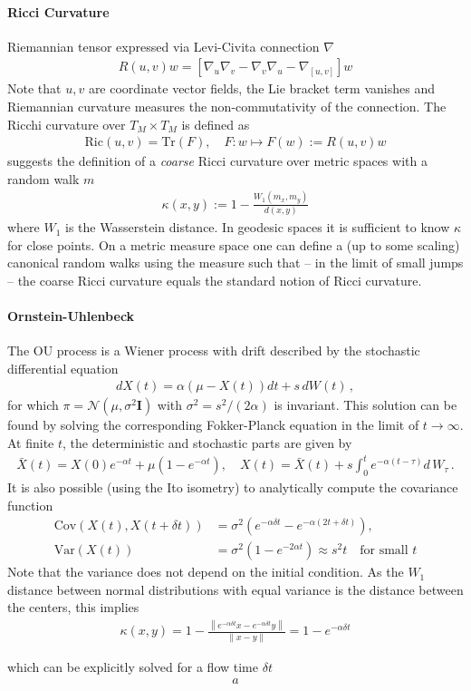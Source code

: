 \documentclass{article}
\begin{document}
\paragraph{Ricci Curvature} Riemannian tensor expressed via Levi-Civita connection $\nabla$
\begin{align}
R(u,v)w = \left[ \nabla_u \nabla_v- \nabla_v \nabla_u - \nabla_{[u,v]} \right] w
\end{align}
Note that $u,v$ are coordinate vector fields, the Lie bracket term vanishes and Riemannian curvature measures the non-commutativity of the connection. The Ricchi curvature over $T_M \times T_M$ is defined as
\begin{align}
\text{Ric}(u,v) = \text{Tr}(F), \quad F: w \mapsto F(w):=  R(u,v) w
\end{align}
\cite{ollivier2009ricci} suggests the definition of a \textit{coarse} Ricci curvature over metric spaces with a random walk $m$
\begin{align}
\kappa(x,y):=1 - \frac{W_1(m_x,m_y)}{d(x,y)}
\end{align}
where $W_1$ is the Wasserstein distance. In geodesic spaces it is sufficient to know $\kappa$ for close points. On a metric measure space one can define a (up to some scaling) canonical random walks using the measure such that -- in the limit of small jumps -- the coarse Ricci curvature equals the standard notion of Ricci curvature. 


\paragraph{Ornstein-Uhlenbeck} The OU process is a Wiener process with drift described by the stochastic differential equation
\begin{align}
dX(t) = \alpha (\mu - X(t)) dt + s \, dW(t)\,, 
\end{align}
for which $\pi = \mathcal N(\mu,\sigma^2 \mathbf I)$ with $\sigma^2 = s^2/(2\alpha)$ is invariant. This solution can be found by solving the corresponding Fokker-Planck equation in the limit of $t \to \infty$. At finite $t$, the deterministic and stochastic parts are given by 
\begin{align}
\bar X(t) = X(0) e^{-\alpha t} + \mu \left( 1- e^{- \alpha t} \right), \quad 
X(t) = \bar X(t) + s \int_0^t  e^{- \alpha (t-\tau)}  d\, W_\tau\,.
\end{align}
It is also possible (using the Ito isometry) to analytically compute the covariance function 
\begin{align}
\text{Cov}(X(t), X(t+\delta t)) & = \sigma^2 \left( e^{-\alpha \delta t} - e^{-\alpha (2t+\delta t)} \right), \quad  \\
\text{Var}(X(t)) & =  \sigma^2 \left(1- e^{-2\alpha t} \right) \approx s^2 t \quad \text{for small $t$}
\end{align}
Note that the variance does not depend on the initial condition. As the $W_1$ distance between normal distributions with equal variance is the distance between the centers, this implies 
\begin{align}
\kappa(x,y) = 1- \frac{\left\| e^{-\alpha \delta t}x - e^{-\alpha \delta t} y \right\|}{\| x- y\|} = 1- e^{-\alpha \delta t}
\end{align} 

\newpage


which can be explicitly solved for a flow time $\delta t$
\begin{align}
a
\end{align}



\end{document}
